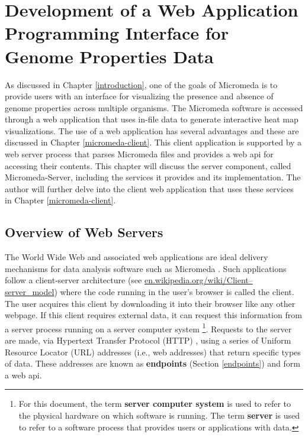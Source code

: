 \chapter{Development of a Web Application Programming Interface for Genome Properties Data} \label{micromeda-server}

As discussed in Chapter \ref{introduction}, one of the goals of Micromeda is to provide users with an interface for visualizing the presence and absence of genome properties across multiple organisms. The Micromeda software is accessed through a web application that uses in-file data to generate interactive heat map visualizations. The use of a web application has several advantages and these are discussed in Chapter \ref{micromeda-client}. This client application is supported by a web server process that parses Micromeda files and provides a web \gls{api} for accessing their contents. This chapter will discuss the server component, called Micromeda-Server, including the services it provides and its implementation. The author will further delve into the client web  application that uses these services in Chapter \ref{micromeda-client}.

\section{Overview of Web Servers} \label{web-servers}

The World Wide Web and associated web applications are ideal delivery mechanisms for data analysis software such as Micromeda \cite{berners1994world}. Such applications follow a client-server architecture \cite{svobodova1985client} (see \href{en.wikipedia.org/wiki/Client–server\_model}{en.wikipedia.org/wiki/Client–server\_model}) where the code running in the user's browser is called the client. The user acquires this client by downloading it into their browser like any other webpage. If this client requires external data, it can request this information from a server process running on a server computer system \footnote{For this document, the term \textbf{server computer system} is used to refer to the physical hardware on which software is running. The term \textbf{server} is used to refer to a software process that provides users or applications with data.}. Requests to the server are made, via Hypertext Transfer Protocol (HTTP) \cite{fielding1999hypertext}, using a series of Uniform Resource Locator (URL) addresses \cite{berners1994rfc} (i.e., web addresses) that return specific types of data. These addresses are known as \textbf{endpoints} (Section \ref{endpoints}) and form a web \gls{api}.

